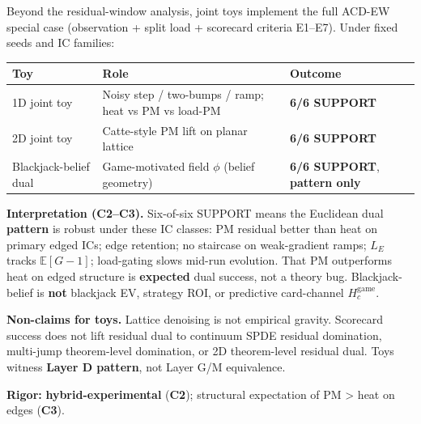 \documentclass[
  11pt,
]{article}
\newcounter{none} %
\begin{document}
Beyond the residual-window analysis, joint toys implement the full
ACD-EW special case (observation + split load + scorecard criteria
E1--E7). Under fixed seeds and IC families:

{\def\LTcaptype{none} %
\begin{longtable}[]{@{}
  >{\raggedright\arraybackslash}p{}
  >{\raggedright\arraybackslash}p{}
  >{\raggedright\arraybackslash}p{}@{}}
\toprule\noalign{}
\begin{minipage}[b]{\linewidth}\raggedright
Toy
\end{minipage} & \begin{minipage}[b]{\linewidth}\raggedright
Role
\end{minipage} & \begin{minipage}[b]{\linewidth}\raggedright
Outcome
\end{minipage} \\
\midrule\noalign{}
\endhead
\bottomrule\noalign{}
\endlastfoot
1D joint toy & Noisy step / two-bumps / ramp; heat vs PM vs load-PM &
\textbf{6/6 SUPPORT} \\
2D joint toy & Catte-style PM lift on planar lattice & \textbf{6/6
SUPPORT} \\
Blackjack-belief dual & Game-motivated field \(\phi\) (belief geometry)
& \textbf{6/6 SUPPORT}, \textbf{pattern only} \\
\end{longtable}
}

\textbf{Interpretation (C2--C3).} Six-of-six SUPPORT means the Euclidean
dual \textbf{pattern} is robust under these IC classes: PM residual
better than heat on primary edged ICs; edge retention; no staircase on
weak-gradient ramps; \(L_E\) tracks \(\mathbb{E}[G-1]\); load-gating
slows mid-run evolution. That PM outperforms heat on edged structure is
\textbf{expected} dual success, not a theory bug. Blackjack-belief is
\textbf{not} blackjack EV, strategy ROI, or predictive card-channel
\(H_c^{\mathrm{game}}\).

\textbf{Non-claims for toys.} Lattice denoising is not empirical
gravity. Scorecard success does not lift residual dual to continuum SPDE
residual domination, multi-jump theorem-level domination, or 2D
theorem-level residual dual. Toys witness \textbf{Layer D pattern}, not
Layer G/M equivalence.

\textbf{Rigor:} \textbf{hybrid-experimental} (\textbf{C2}); structural
expectation of PM \textgreater{} heat on edges (\textbf{C3}).
\end{document}
